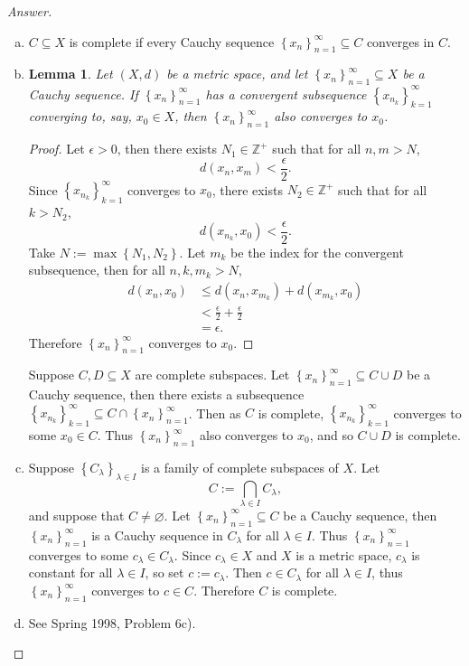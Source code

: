 \documentclass[12pt]{article}
\newcommand{\z}{\mathbb{Z}}
\newcommand\paren[1]{\left( #1 \right)}
\newcommand\setb[1]{\left \{ #1 \right \}}
\newtheorem{lemma}[theorem]{Lemma}
\theoremstyle{definition}
\begin{document}
\begin{proof}[Answer]
    \noindent
    \begin{enumerate}[(a)]
        \item $C \subseteq X$ is complete if every Cauchy sequence $\setb{ x_n }_{n = 1}^{\infty} \subseteq C$ converges in $C$.
        \item 
        \begin{lemma}
            Let $(X,d)$ be a metric space, and let $\setb{ x_n }_{n=1}^{\infty} \subseteq X$ be a Cauchy sequence. If $\setb{ x_n }_{n=1}^{\infty}$ has a convergent subsequence $\setb{ x_{n_k} }_{k=1}^{\infty}$ converging to, say, $x_0 \in X$, then $\setb{ x_n }_{n=1}^{\infty}$ also converges to $x_0$. 
        \end{lemma}
        \begin{proof}
            Let $\epsilon > 0$, then there exists $N_1 \in \z^+$ such that for all $n , m > N$,
            \[
                d(x_n,x_m) < \frac{\epsilon}{2}.
            \]
            Since $\setb{ x_{n_k} }_{k=1}^{\infty}$ converges to $x_0$, there exists $N_2 \in \z^+$ such that for all $k > N_2$, 
            \[
                d \paren{ x_{n_k} , x_0 } < \frac{\epsilon}{2}.
            \]
            Take $N := \max \setb{N_1,N_2}$. Let $m_k$ be the index for the convergent subsequence, then for all $n , k , m_k > N$,
            \begin{align*}
                d(x_n,x_0) & \leq d \paren{ x_n , x_{m_k} } + d \paren{ x_{m_k} , x_0 } \\
                & < \frac{\epsilon}{2} + \frac{\epsilon}{2} \\
                & = \epsilon.
            \end{align*}
            Therefore $\setb{ x_n }_{n=1}^{\infty}$ converges to $x_0$.
        \end{proof}
        Suppose $C , D \subseteq X$ are complete subspaces. Let $\setb{ x_n }_{n=1}^{\infty} \subseteq C \cup D$ be a Cauchy sequence, then there exists a subsequence $\setb{ x_{n_k} }_{k = 1}^{\infty} \subseteq C \cap \setb{ x_n }_{n=1}^{\infty}$. Then as $C$ is complete, $\setb{ x_{n_k} }_{k = 1}^{\infty}$ converges to some $x_0 \in C$. Thus $\setb{ x_n }_{n=1}^{\infty}$ also converges to $x_0$, and so $C \cup D$ is complete.
        \item 
        Suppose $\setb{ C_{\lambda} }_{\lambda \in I}$ is a family of complete subspaces of $X$. Let
        \[
            C := \bigcap\limits_{ \lambda \in I } C_{\lambda},
        \]
        and suppose that $C \neq \varnothing$. Let $\setb{ x_n }_{n = 1}^{\infty} \subseteq C$ be a Cauchy sequence, then $\setb{ x_n }_{n = 1}^{\infty}$ is a Cauchy sequence in $C_{\lambda}$ for all $\lambda \in I$. Thus $\setb{ x_n }_{n = 1}^{\infty}$ converges to some $c_{\lambda} \in C_{\lambda}$. Since $c_{\lambda} \in X$ and $X$ is a metric space, $c_{\lambda}$ is constant for all $\lambda \in I$, so set $c := c_{\lambda}$. Then $c \in C_{\lambda}$ for all $\lambda \in I$, thus $\setb{ x_n }_{n = 1}^{\infty}$ converges to $c \in C$. Therefore $C$ is complete.
        \item See Spring 1998, Problem 6c).
    \end{enumerate}
\end{proof}
\end{document}
